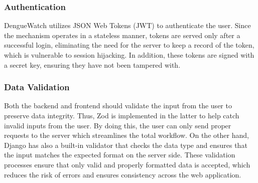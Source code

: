 \subsubsection{Authentication}
DengueWatch utilizes JSON Web Tokens (JWT) to authenticate the user. Since the mechanism operates in a stateless manner, tokens are served only after a successful login, eliminating the need for the server to keep a record of the token, which is vulnerable to session hijacking. In addition, these tokens are signed with a secret key, ensuring they have not been tampered with. 

\subsubsection{Data Validation}
Both the backend and frontend should validate the input from the user to preserve data integrity. Thus, Zod is implemented in the latter to help catch invalid inputs from the user. By doing this, the user can only send proper requests to the server which streamlines the total workflow. On the other hand, Django has also a built-in validator that checks the data type and ensures that the input matches the expected format on the server side. These validation processes ensure that only valid and properly formatted data is accepted, which reduces the risk of errors and ensures consistency across the web application. 




